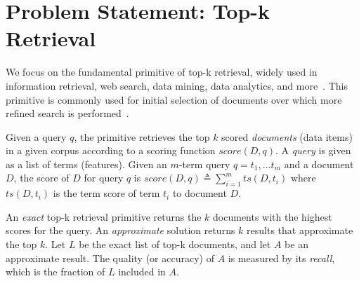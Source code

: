 

\section{Problem Statement: Top-k Retrieval}
\label{sec:problem}

We focus on the fundamental primitive of top-k retrieval, widely used in 
information retrieval, web search, data mining, data analytics, and more~\cite{top-k-survey}. 
This primitive is commonly used for initial selection of documents over which more refined search is performed~\cite{Wang:2011}. 

Given a query $q$, the primitive retrieves the top $k$ scored  \emph{documents} (data items) in a given corpus
according to a scoring function $\textit{score}(D, q)$.  
A \emph{query} is given as a list of terms (features). Given an $m$-term query $q = t_1, \dots t_m$ and a document $D$, the score of $D$ for query $q$ is 
$\textit{score}(D, q) \triangleq \sum_{i=1}^m ts(D, t_i)$ 
where $ts(D, t_i)$ is the term score of term $t_i$ to document $D$. 

An \emph{exact} top-k retrieval primitive returns the $k$ documents with the highest scores for the query.
An \emph{approximate} solution returns $k$ results that approximate the top $k$. 
Let $L$ be the exact list of top-k documents,  
and let $A$ be an approximate result. 
The quality (or accuracy) of  $A$ is measured by its
\emph{recall}, which is  the fraction of $L$ included in $A$.


